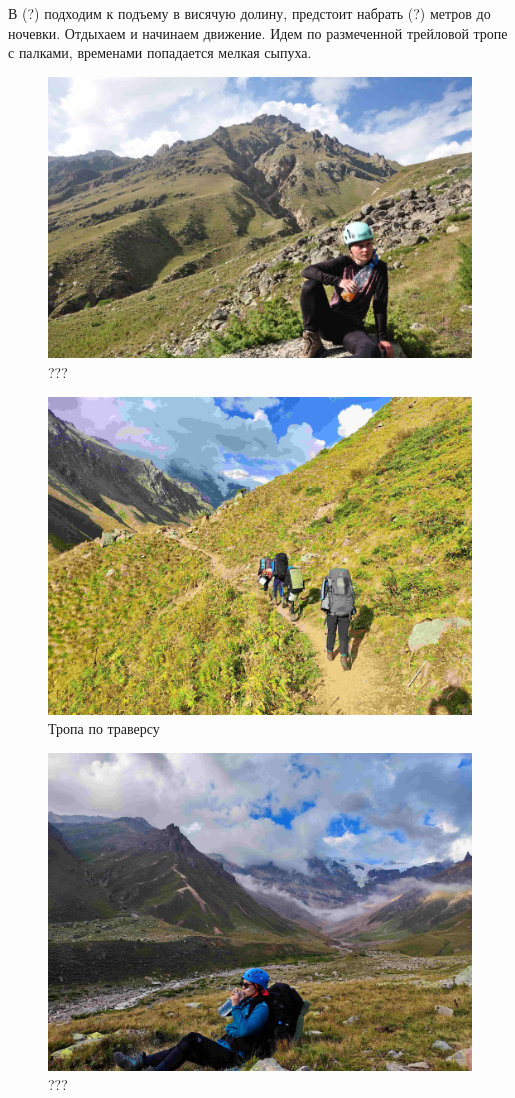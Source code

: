 В (?) подходим к подъему в висячую долину, предстоит набрать (?) метров до ночевки. Отдыхаем и начинаем движение.
Идем по размеченной трейловой тропе с палками, временами попадается мелкая сыпуха.

\begin{figure}[h!]
	\centering
	\includegraphics[width=0.7\linewidth]{../pics/DSC_0470 2.JPG}
	\caption{???}
	\label{fig:DSC_0470 2.JPG}
\end{figure}

\begin{figure}[h!]
	\centering
	\includegraphics[width=0.7\linewidth]{../pics/IMG_20240829_170756.jpg}
	\caption{Тропа по траверсу}
	\label{fig:IMG_20240829_170756.jpg}
\end{figure}

\begin{figure}[h!]
	\centering
	\includegraphics[width=0.7\linewidth]{../pics/IMG_20240829_175721.jpg}
	\caption{???}
	\label{fig:IMG_20240829_175721.jpg}
\end{figure}

